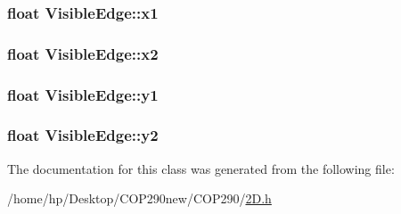 \subsubsection[{\texorpdfstring{x1}{x1}}]{\setlength{\rightskip}{0pt plus 5cm}float Visible\+Edge\+::x1}\hypertarget{class_visible_edge_a7baae9b2413ae1375d49ff023f272ad3}{}\label{class_visible_edge_a7baae9b2413ae1375d49ff023f272ad3}
\subsubsection[{\texorpdfstring{x2}{x2}}]{\setlength{\rightskip}{0pt plus 5cm}float Visible\+Edge\+::x2}\hypertarget{class_visible_edge_a6524c696bcd4e189dd393832e95bde4c}{}\label{class_visible_edge_a6524c696bcd4e189dd393832e95bde4c}
\subsubsection[{\texorpdfstring{y1}{y1}}]{\setlength{\rightskip}{0pt plus 5cm}float Visible\+Edge\+::y1}\hypertarget{class_visible_edge_ad371a067b7175df3ee9a7672a0f36986}{}\label{class_visible_edge_ad371a067b7175df3ee9a7672a0f36986}
\subsubsection[{\texorpdfstring{y2}{y2}}]{\setlength{\rightskip}{0pt plus 5cm}float Visible\+Edge\+::y2}\hypertarget{class_visible_edge_a0e125191d1f182de18ce9dfb35a98d68}{}\label{class_visible_edge_a0e125191d1f182de18ce9dfb35a98d68}


The documentation for this class was generated from the following file\+:\begin{DoxyCompactItemize}
\item 
/home/hp/\+Desktop/\+C\+O\+P290new/\+C\+O\+P290/\hyperlink{2_d_8h}{2\+D.\+h}\end{DoxyCompactItemize}
